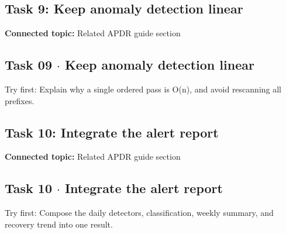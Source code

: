 \documentclass[11pt]{article}
\begin{document}
\begin{keepsection}
\section{Task 9: Keep anomaly detection linear}

\textbf{Connected topic:} Related APDR guide section

\begin{keepsection}
\subsection{Task 09 \ensuremath{\cdot} Keep anomaly detection linear}

Try first: Explain why a single ordered pass is O(n), and avoid rescanning all prefixes.

\end{keepsection}
\end{keepsection}

\begin{keepsection}
\section{Task 10: Integrate the alert report}

\textbf{Connected topic:} Related APDR guide section

\begin{keepsection}
\subsection{Task 10 \ensuremath{\cdot} Integrate the alert report}

Try first: Compose the daily detectors, classification, weekly summary, and recovery trend into one result.

\end{keepsection}
\end{keepsection}


\clearpage
\end{document}
